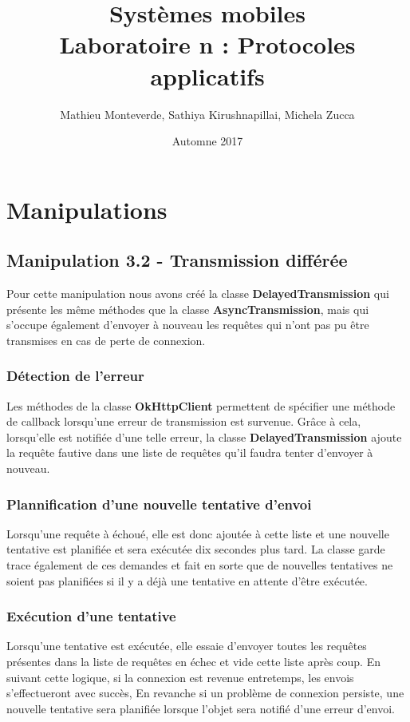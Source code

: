 \documentclass[francais,12pt]{article}
\title{Systèmes mobiles \\ Laboratoire n\textordmasculine2 : Protocoles applicatifs}
\author{Mathieu Monteverde, Sathiya Kirushnapillai, Michela Zucca}
\date{Automne 2017}
\begin{document}
	
	\maketitle
	
	\setlength{\parskip}{1em}
	
	\section*{Manipulations}
	
	\subsection*{Manipulation 3.2 - Transmission différée}
	
	Pour cette manipulation nous avons créé la classe \textbf{DelayedTransmission} qui présente les même méthodes que la classe \textbf{AsyncTransmission}, mais qui s'occupe également d'envoyer à nouveau les requêtes qui n'ont pas pu être transmises en cas de perte de connexion. 
	
	\subsubsection*{Détection de l'erreur}
	Les méthodes de la classe \textbf{OkHttpClient} permettent de spécifier une méthode de callback lorsqu'une erreur de transmission est survenue. Grâce à cela, lorsqu'elle est notifiée d'une telle erreur, la classe \textbf{DelayedTransmission} ajoute la requête fautive dans une liste de requêtes qu'il faudra tenter d'envoyer à nouveau. 
	
	\subsubsection*{Plannification d'une nouvelle tentative d'envoi}
	Lorsqu'une requête à échoué, elle est donc ajoutée à cette liste et une nouvelle tentative est planifiée et sera exécutée dix secondes plus tard. La classe garde trace également de ces demandes et fait en sorte que de nouvelles tentatives ne soient pas planifiées si il y a déjà une tentative en attente d'être exécutée.
	
	\subsubsection*{Exécution d'une tentative}
	Lorsqu'une tentative est exécutée, elle essaie d'envoyer toutes les requêtes présentes dans la liste de requêtes en échec et vide cette liste après coup. En suivant cette logique, si la connexion est revenue entretemps, les envois s'effectueront avec succès, En revanche si un problème de connexion persiste, une nouvelle tentative sera planifiée lorsque l'objet sera notifié d'une erreur d'envoi. 
	
\end{document}
